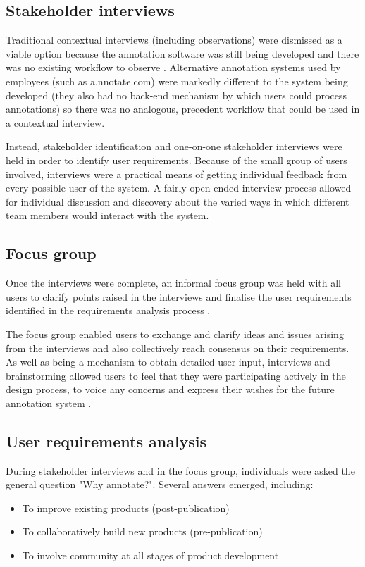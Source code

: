 \subsection{Stakeholder interviews}
Traditional contextual interviews (including observations) were dismissed as a viable option because the annotation software was still being developed and there was no existing workflow to observe \citep[p. 38]{BeyerHoltzblatt}. Alternative annotation systems used by employees (such as a.nnotate.com) were markedly different to the system being developed (they also had no back-end mechanism by which users could process annotations) so there was no analogous, precedent workflow that could be used in a contextual interview. 

Instead, stakeholder identification and one-on-one stakeholder interviews were held in order to identify user requirements. Because of the small group of users involved, interviews were a practical means of getting individual feedback from every possible user of the system. A fairly open-ended interview process allowed for individual discussion and discovery about the varied ways in which different team members would interact with the system. 

\subsection{Focus group}
Once the interviews were complete, an informal focus group was held with all users to clarify points raised in the interviews and finalise the user requirements identified in the requirements analysis process \citep[p. 365]{RogersPreece}. 

The focus group enabled users to exchange and clarify ideas and issues arising from the interviews and also collectively reach consensus on their requirements. As well as being a mechanism to obtain detailed user input, interviews and brainstorming allowed users to feel that they were participating actively in the design process, to voice any concerns and express their wishes for the future annotation system \citep[p. 365]{RogersPreece}. 

\subsection{User requirements analysis}
During stakeholder interviews and in the focus group, individuals were asked the general question "Why annotate?". Several answers emerged, including: 
\begin{itemize}
 \item To improve existing products (post-publication)
 \item To collaboratively build new products (pre-publication)
 \item To involve community at all stages of product development
\end{itemize}

